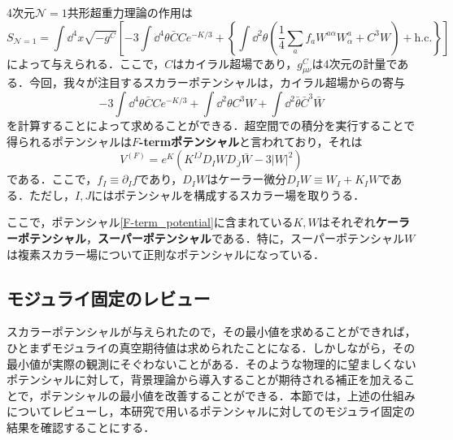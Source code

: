 \documentclass[a4paper,uplatex,dvipdfmx]{jsarticle}
\theoremstyle{definition}
\begin{document}
4次元$\mathcal{N}=1$共形超重力理論の作用は
\begin{equation}
   S_{\mathcal{N}=1}
   =
   \int\dd^{4}x
   \sqrt{-g^{C}}
   \left[  
      -3\int\dd^4 \theta
      \bar{C}Ce^{-K/3}
      +
      \left\{  
         \int\dd^2\theta
         \left(  
            \frac{1}{4}\sum_{a}f_{a}W^{a\alpha}W_{\alpha}^{a}
            +
            C^3W
         \right)
         +
         \text{h.c.}
      \right\}
   \right]
   \nonumber
\end{equation}
によって与えられる\cite{Kaku_SuperconformalUnified_1977}．ここで，$C$はカイラル超場であり，$g_{\mu\nu}^{C}$は4次元の計量である．今回，我々が注目するスカラーポテンシャルは，カイラル超場からの寄与
\begin{equation}
   -3
   \int\dd^4\theta
   \bar{C}Ce^{-K/3}
   +
   \int\dd^2\theta
   C^3 W
   +
   \int\dd^2\bar{\theta}
   \bar{C}^3\bar{W}
   \nonumber
\end{equation}
を計算することによって求めることができる．超空間での積分を実行することで得られるポテンシャルは\textbf{$F$-termポテンシャル}と言われており，それは
\begin{equation}
   V^{(F)}
   =
   e^{K}
   \left(  
      K^{I\bar{J}}D_{I}WD_{\bar{J}}\bar{W}
      -
      3|W|^2
   \right)
   \label{F-term_potential}
\end{equation}
である．ここで，$f_{I}\equiv\partial_{I}f$であり，$D_{I}W$はケーラー微分$D_{I}W\equiv W_{I}+K_{I}W$である．ただし，$I,J$にはポテンシャルを構成するスカラー場を取りうる．

ここで，ポテンシャル\eqref{F-term_potential}に含まれている$K,W$はそれぞれ\textbf{ケーラーポテンシャル}，\textbf{スーパーポテンシャル}である．特に，スーパーポテンシャル$W$は複素スカラー場について正則なポテンシャルになっている．


\subsection{モジュライ固定のレビュー}

スカラーポテンシャルが与えられたので，その最小値を求めることができれば，ひとまずモジュライの真空期待値は求められたことになる．しかしながら，その最小値が実際の観測にそぐわないことがある．そのような物理的に望ましくないポテンシャルに対して，背景理論から導入することが期待される補正を加えることで，ポテンシャルの最小値を改善することができる\cite{Abe_ModuliStabilization_2007a}．本節では，上述の仕組みについてレビューし，本研究で用いるポテンシャルに対してのモジュライ固定の結果を確認することにする．
\end{document}
